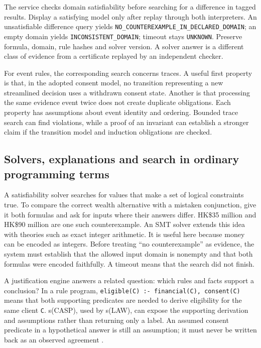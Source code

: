 The service checks domain satisfiability before searching for a difference in
tagged results. Display a satisfying model only after replay through both
interpreters. An unsatisfiable difference query yields
\texttt{NO\_COUNTEREXAMPLE\_IN\_DECLARED\_DOMAIN}; an empty domain yields
\texttt{INCONSISTENT\_DOMAIN}; timeout stays \texttt{UNKNOWN}. Preserve formula,
domain, rule hashes and solver version. A solver answer is a different class
of evidence from a certificate replayed by an independent checker.

For event rules, the corresponding search concerns traces. A useful first
property is that, in the adopted consent model, no transition representing a new
streamlined decision uses a withdrawn consent state. Another is that processing
the same evidence event twice does not create duplicate obligations. Each
property has assumptions about event identity and ordering. Bounded trace search
can find violations, while a proof of an invariant can establish a stronger
claim if the transition model and induction obligations are checked.

\subsection{Solvers, explanations and search in ordinary programming terms}
\label{merge:P-01a-language-lesson:05}


A satisfiability solver searches for values that make a set of logical
constraints true. To compare the correct wealth alternative with a mistaken
conjunction, give it both formulas and ask for inputs where their answers differ.
HK\$35 million and HK\$90 million are one such counterexample. An SMT solver
extends this idea with theories such as exact integer arithmetic. It is useful
here because money can be encoded as integers. Before treating ``no
counterexample'' as evidence, the system must establish that the allowed input
domain is nonempty and that both formulas were encoded faithfully. A timeout
means that the search did not finish.


A justification engine answers a related question: which rules and facts support
a conclusion? In a rule program, \texttt{eligible(C) :- financial(C), consent(C)}
means that both supporting predicates are needed to derive eligibility for the
same client \texttt{C}. s(CASP), used by s(LAW), can expose the supporting
derivation and assumptions rather than returning only a label. An assumed
consent predicate in a hypothetical answer is still an assumption; it must never
be written back as an observed agreement \citep{slaw2024}.


